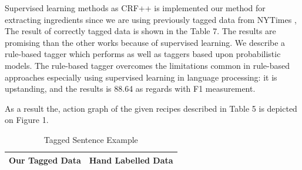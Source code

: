  Supervised learning methods as CRF++ \cite{crf} is implemented our method for extracting ingredients since we are using previously tagged data from NYTimes \cite{greene}, The result of correctly tagged data is shown in the Table 7.  The results are promising than the other works because of supervised learning. We describe a rule-based tagger which
performs as well as taggers based upon probabilistic models. The rule-based tagger overcomes the limitations common in rule-based approaches especially using supervised learning in language processing: it is upstanding, and the results is 88.64  as regards with F1 measurement. 

As a result the, action graph of the given recipes described in Table 5 is depicted on Figure 1.  

\begin{table}[]
\centering
\caption{Tagged Sentence Example}
\label{my-label}
\begin{tabular}{|l|l|}
\hline
\textbf{Our Tagged Data}                                                                                                                                                                                                                                                                                                                                                                                                                                                  & \textbf{Hand Labelled Data}                                                                                                                                                                                                                                                                                                                                                                                                                                                     \\ \hline

\end{tabular}
\end{table}
